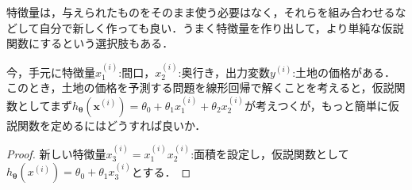 特徴量は，与えられたものをそのまま使う必要はなく，それらを組み合わせるなどして自分で新しく作っても良い．うまく特徴量を作り出して，より単純な仮説関数にするという選択肢もある．

\begin{qu}
今，手元に特徴量$x_1^{(i)}$:間口，$x_2^{(i)}$:奥行き，出力変数$y^{(i)}$:土地の価格がある．このとき，土地の価格を予測する問題を線形回帰で解くことを考えると，仮説関数としてまず$h_{{\bm \theta}}({\bm x}^{(i)})=\theta_0+\theta_1 x_1^{(i)}+\theta_2 x_2^{(i)}$が考えつくが，もっと簡単に仮説関数を定めるにはどうすれば良いか．
\end{qu}
\begin{proof}
新しい特徴量$x_3^{(i)}=x_1^{(i)}x_2^{(i)}$:面積を設定し，仮説関数として$h_{{\bm \theta}}(x^{(i)})=\theta_0+\theta_1 x_3^{(i)}$とする．
\end{proof}
